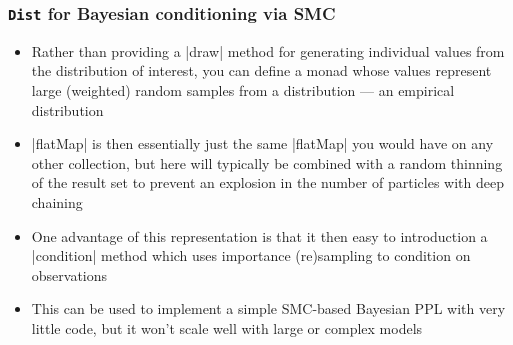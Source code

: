 \documentclass[mathserif,handout]{beamer}
\begin{document}

\begin{frame}[fragile]
  \frametitle{\texttt{Dist} for Bayesian conditioning via SMC}
  \begin{itemize}
  \item Rather than providing a |draw| method for generating individual values from the distribution of interest, you can define a monad whose values represent large (weighted) random samples from a distribution --- an empirical distribution
  \item |flatMap| is then essentially just the same |flatMap| you would have on any other collection, but here will typically be combined with a random thinning of the result set to prevent an explosion in the number of particles with deep chaining
  \item One advantage of this representation is that it then easy to introduction a |condition| method which uses importance (re)sampling to condition on observations
    \item This can be used to implement a simple SMC-based Bayesian PPL with very little code, but it won't scale well with large or complex models
    \end{itemize}
\end{frame}
\end{document}
